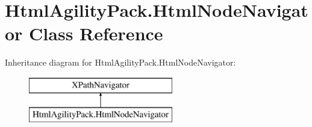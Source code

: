 \hypertarget{class_html_agility_pack_1_1_html_node_navigator}{}\section{Html\+Agility\+Pack.\+Html\+Node\+Navigator Class Reference}
\label{class_html_agility_pack_1_1_html_node_navigator}
Inheritance diagram for Html\+Agility\+Pack.\+Html\+Node\+Navigator\+:\begin{figure}[H]
\begin{center}
\leavevmode
\includegraphics[height=2.000000cm]{class_html_agility_pack_1_1_html_node_navigator}
\end{center}
\end{figure}
